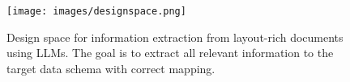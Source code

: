 \begin{figure}[ht]
    \centering    
    \texttt{[image: images/designspace.png]}
    \caption{Design space for information extraction from layout-rich documents using LLMs. The goal is to extract all relevant information to the target data schema with correct mapping.}
    \label{fig:design_space}
\end{figure}

